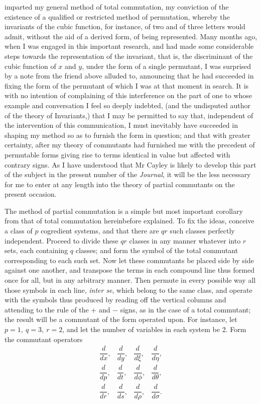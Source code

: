 \documentclass[11pt]{article}
\newcommand{\sourcepage}[1]{\marginpar{\scriptsize p.~#1}}
\begin{document}
{{\sourcepage{318}
imparted my general method of total commutation, my conviction of the existence of a qualified or restricted method of permutation, whereby the invariants of the cubic function, for instance, of two and of three letters would admit, without the aid of a derived form, of being represented. Many months ago, when I was engaged in this important research, and had made some considerable steps towards the representation of the invariant, that is, the discriminant of the cubic function of $x$ and $y$, under the form of a single permutant, I was surprised by a note from the friend above alluded to, announcing that he had succeeded in fixing the form of the permutant of which I was at that moment in search. It is with no intention of complaining of this interference on the part of one to whose example and conversation I feel so deeply indebted, (and the undisputed author of the theory of Invariants,) that I may be permitted to say that, independent of the intervention of this communication, I must inevitably have succeeded in shaping my method so as to furnish the form in question; and that with greater certainty, after my theory of commutants had furnished me with the precedent of permutable forms giving rise to terms identical in value but affected with contrary signs. As I have understood that Mr Cayley is likely to develop this part of the subject in the present number of the \emph{Journal}, it will be the less necessary for me to enter at any length into the theory of partial commutants on the present occasion.

The method of partial commutation is a simple but most important corollary from that of total commutation hereinbefore explained. To fix the ideas, conceive a class of $p$ cogredient systems, and that there are $qr$ such classes perfectly independent. Proceed to divide these $qr$ classes in any manner whatever into $r$ sets, each containing $q$ classes; and form the symbol of the total commutant corresponding to each such set. Now let these commutants be placed side by side against one another, and transpose the terms in each compound line thus formed once for all, but in any arbitrary manner. Then permute in every possible way all those symbols in each line, \emph{inter se}, which belong to the same class, and operate with the symbols thus produced by reading off the vertical columns and attending to the rule of the $+$ and $-$ signs, as in the case of a total commutant; the result will be a commutant of the form operated upon. For instance, let $p=1,\ q=3,\ r=2$, and let the number of variables in each system be 2. Form the commutant operators
\[
\begin{array}{cc|cc}
\dfrac{d}{dx},&\dfrac{d}{dy},&\dfrac{d}{d\xi},&\dfrac{d}{d\eta},\\[0.6em]
\dfrac{d}{dp},&\dfrac{d}{dt},&\dfrac{d}{d\phi},&\dfrac{d}{d\theta},\\[0.6em]
\dfrac{d}{dr},&\dfrac{d}{ds},&\dfrac{d}{d\rho},&\dfrac{d}{d\sigma}.
\end{array}
\]

}}
\end{document}
